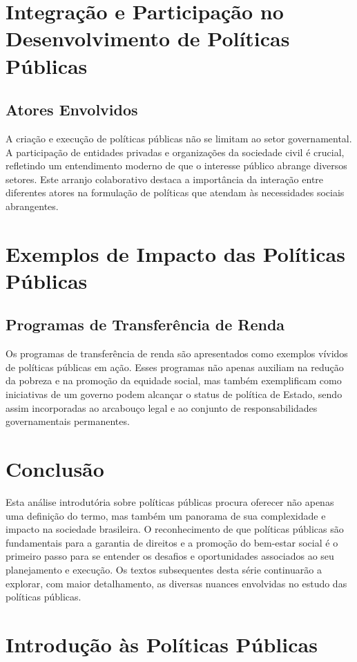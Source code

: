 \documentclass[
   article,       
   12pt,          
   oneside,       
   a4paper,       
   english,       
   brazil,        
   sumario=tradicional
   ]{abntex2}
\begin{document}
\section{Integração e Participação no Desenvolvimento de Políticas Públicas}
    \subsection{Atores Envolvidos}
        A criação e execução de políticas públicas não se limitam ao setor governamental. A participação de entidades privadas e organizações da sociedade civil é crucial, refletindo um entendimento moderno de que o interesse público abrange diversos setores. Este arranjo colaborativo destaca a importância da interação entre diferentes atores na formulação de políticas que atendam às necessidades sociais abrangentes.

\section{Exemplos de Impacto das Políticas Públicas}
    \subsection{Programas de Transferência de Renda}
        Os programas de transferência de renda são apresentados como exemplos vívidos de políticas públicas em ação. Esses programas não apenas auxiliam na redução da pobreza e na promoção da equidade social, mas também exemplificam como iniciativas de um governo podem alcançar o status de política de Estado, sendo assim incorporadas ao arcabouço legal e ao conjunto de responsabilidades governamentais permanentes.

\section{Conclusão}
    Esta análise introdutória sobre políticas públicas procura oferecer não apenas uma definição do termo, mas também um panorama de sua complexidade e impacto na sociedade brasileira. O reconhecimento de que políticas públicas são fundamentais para a garantia de direitos e a promoção do bem-estar social é o primeiro passo para se entender os desafios e oportunidades associados ao seu planejamento e execução. Os textos subsequentes desta série continuarão a explorar, com maior detalhamento, as diversas nuances envolvidas no estudo das políticas públicas.
\section{Introdução às Políticas Públicas}
\end{document}
